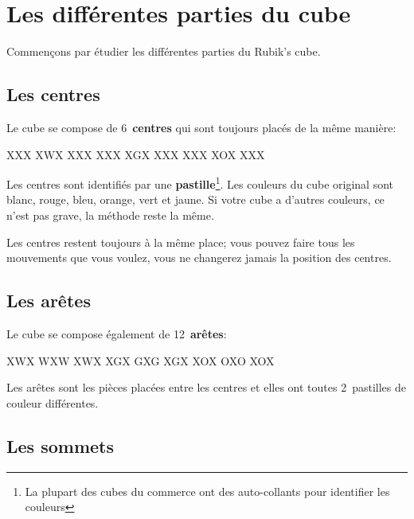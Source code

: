 \chapter{Les différentes parties du cube}

Commençons par étudier les différentes parties du Rubik's cube.

\section{Les centres}

Le cube se compose de 6~\textbf{centres} qui sont toujours placés de la même manière:

\begin{center}
	\RubikFaceUp%
	{X}{X}{X}%
	{X}{W}{X}%
	{X}{X}{X}
	\RubikFaceRight%
	{X}{X}{X}%
	{X}{G}{X}%
	{X}{X}{X}
	\RubikFaceFront%
	{X}{X}{X}%
	{X}{O}{X}%
	{X}{X}{X}
\end{center}

Les centres sont identifiés par une \textbf{pastille}\footnote{La plupart des cubes du commerce ont des auto-collants pour identifier les couleurs}. Les
couleurs du cube original sont blanc, rouge, bleu, orange, vert et jaune.
Si votre cube a d'autres couleurs, ce n'est pas grave, la méthode reste la
même.

Les centres restent toujours à la même place; vous pouvez faire tous les mouvements que vous voulez, vous ne changerez jamais la position des centres.

\section{Les arêtes}
\begin{samepage}
Le cube se compose également de 12~\textbf{arêtes}:

\begin{center}
	\RubikFaceUp%
	{X}{W}{X}%
	{W}{X}{W}%
	{X}{W}{X}
	\RubikFaceRight%
	{X}{G}{X}%
	{G}{X}{G}%
	{X}{G}{X}
	\RubikFaceFront%
	{X}{O}{X}%
	{O}{X}{O}%
	{X}{O}{X}
\end{center}
\end{samepage}

Les arêtes sont les pièces placées entre les centres et elles ont toutes 2~pastilles de couleur différentes.

\section{Les sommets}

